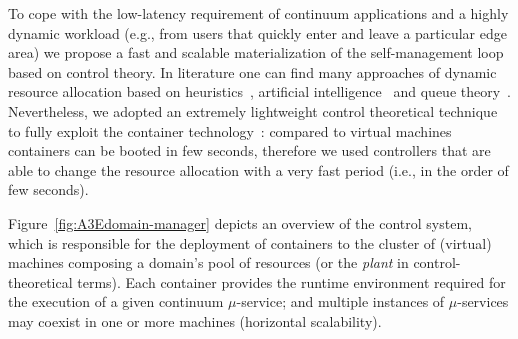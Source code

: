 To cope with the low-latency requirement of continuum applications and a highly dynamic workload  (e.g., from users that quickly enter and leave a particular edge area) we 
propose a fast and scalable materialization of the self-management loop based on control theory.  In literature one can find many approaches of dynamic resource allocation based on heuristics~\cite{dustdar0}, artificial intelligence~\cite{ia1} and queue theory~\cite{queue1}. Nevertheless, we adopted an extremely lightweight control theoretical technique to fully exploit the container technology~\cite{Quatrocchi2016discrete}: compared to virtual machines containers can be booted in few seconds, therefore we used controllers that are able to change the resource allocation with a very fast period (i.e., in the order of few seconds).

Figure~\ref{fig:A3Edomain-manager} depicts an overview of the control system, which is responsible for the deployment of containers to the cluster of (virtual) machines composing a domain's pool of resources (or the \textit{plant} in control-theoretical terms). Each container provides the runtime environment required for the execution of a given continuum $\mu$-service; and multiple instances of $\mu$-services may coexist in one or more machines (horizontal scalability).



